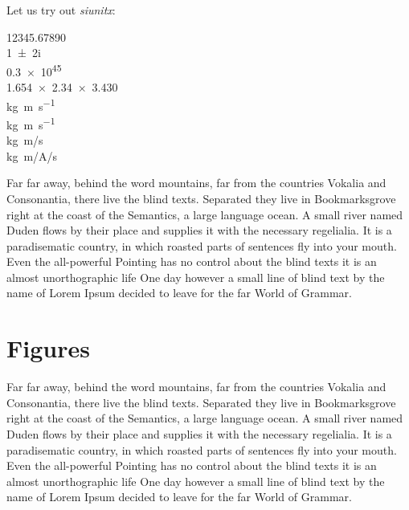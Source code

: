 Let us try out \emph{siunitx}: 

\num{12345,67890} \\
\num{1+-2i}\\
\num{.3e45} \\
\num{1.654 x 2.34 x 3.430}\\
\si{kg.m.s^{-1}} \\
\si{\kilogram\metre\per\second} \\
\si[per-mode=symbol]
{\kilogram\metre\per\second} \\
\si[per-mode=symbol]
{\kilogram\metre\per\ampere\per\second}

Far far away, behind the word mountains, far from the countries Vokalia and
Consonantia, there live the blind texts. Separated they live in
Bookmarksgrove right at the coast of the Semantics, a large language
ocean. A small river named Duden flows by their place and supplies it with
the necessary regelialia. It is a paradisematic country, in which roasted
parts of sentences fly into your mouth. Even the all-powerful Pointing has
no control about the blind texts it is an almost unorthographic life One
day however a small line of blind text by the name of Lorem Ipsum decided
to leave for the far World of Grammar.

\section{Figures}
\label{sec:figures}

Far far away, behind the word mountains, far from the countries Vokalia and
Consonantia, there live the blind texts. Separated they live in
Bookmarksgrove right at the coast of the Semantics, a large language
ocean. A small river named Duden flows by their place and supplies it with
the necessary regelialia. It is a paradisematic country, in which roasted
parts of sentences fly into your mouth. Even the all-powerful Pointing has
no control about the blind texts it is an almost unorthographic life One
day however a small line of blind text by the name of Lorem Ipsum decided
to leave for the far World of Grammar.

